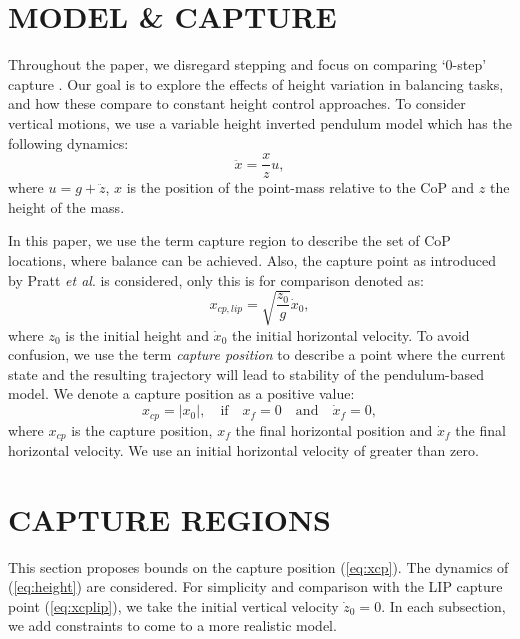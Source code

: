 \documentclass[letterpaper, 10 pt, conference]{ieeeconf}  %
\begin{document}
\section{MODEL \& CAPTURE}\label{sec:models}
Throughout the paper, we disregard stepping and focus on comparing `0-step' capture \cite{koolen2012capturability}. Our goal is to explore the effects of height variation in balancing tasks, and how these compare to constant height control approaches. To consider vertical motions, we use a variable height inverted pendulum model which has the following dynamics:
\begin{equation}
	\ddot{x} = \frac{x}{z}u,
	\label{eq:height}
\end{equation}
where $u=g+\ddot{z}$, $x$ is the position of the point-mass relative to the CoP and $z$ the height of the mass.

In this paper, we use the term capture region \cite{pratt2006capture} to describe the set of CoP locations, where balance can be achieved. Also, the capture point as introduced by Pratt \textit{et al}. is considered, only this is for comparison denoted as:
\begin{equation}
	x_{cp,lip} = \sqrt{\frac{z_0}{g}}\dot{x}_0,
	\label{eq:xcplip}
\end{equation}
where $z_0$ is the initial height and $\dot{x}_0$ the initial horizontal velocity. To avoid confusion, we use the term \textit{capture position} to describe a point where the current state and the resulting trajectory will lead to stability of the pendulum-based model. We denote a capture position as a positive value:
\begin{equation}
	x_{cp}= |x_0|,\quad \text{if} \quad x_f=0 \quad \text{and} \quad \dot{x}_f=0,
	\label{eq:xcp}
\end{equation}
where $x_{cp}$ is the capture position, $x_f$ the final horizontal position and $\dot{x}_f$ the final horizontal velocity. We use an initial horizontal velocity of greater than zero.

\section{CAPTURE REGIONS}\label{sec:regions}
This section proposes bounds on the capture position (\ref{eq:xcp}). The dynamics of (\ref{eq:height}) are considered. For simplicity and comparison with the LIP capture point (\ref{eq:xcplip}), we take the initial vertical velocity $\dot{z}_0=0$. In each subsection, we add constraints to come to a more realistic model. 
\end{document}
